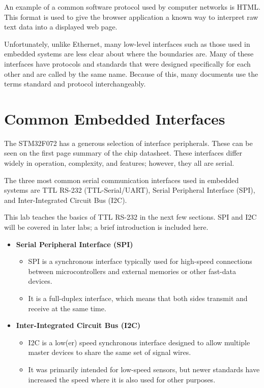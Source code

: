 \documentclass[11pt,fleqn]{book} %
\begin{document}
An example of a common software protocol used by computer networks is HTML. This format is used to give the browser application a known way to interpret raw text data into a displayed web page. 

Unfortunately, unlike Ethernet, many low-level interfaces such as those used in embedded systems are less clear about where the boundaries are. Many of these interfaces have protocols and standards that were designed specifically for each other and are called by the same name. 
Because of this, many documents use the terms standard and protocol interchangeably. 
 

\section{Common Embedded Interfaces}
The STM32F072 has a generous selection of interface peripherals. These can be seen on the first page summary of the chip datasheet. These interfaces differ widely in operation, complexity, and features; however, they all are serial. 

The three most common serial communication interfaces used in embedded systems are TTL RS-232 (TTL-Serial/UART), Serial Peripheral Interface (SPI), and Inter-Integrated Circuit Bus (I2C). 

This lab teaches the basics of TTL RS-232 in the next few sections. SPI and I2C will be covered in later labs; a brief introduction is included here. 

\begin{itemize}
    \item \textbf{Serial Peripheral Interface (SPI)}
    \begin{itemize}
        \item SPI is a synchronous interface typically used for high-speed connections between microcontrollers and external memories or other fast-data devices.
        \item It is a full-duplex interface, which means that both sides transmit and receive at the same time.
    \end{itemize}
    \item \textbf{Inter-Integrated Circuit Bus (I2C)}
    \begin{itemize}
        \item I2C is a low(er) speed synchronous interface designed to allow multiple master devices to share the same set of signal wires. 
        \item It was primarily intended for low-speed sensors, but newer standards have increased the speed where it is also used for other purposes.
    \end{itemize}
\end{itemize}
\end{document}
